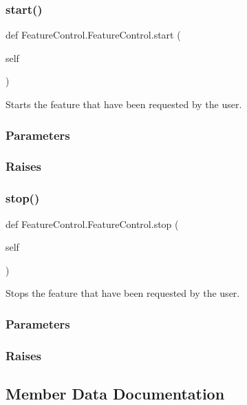 \subsubsection{\texorpdfstring{start()}{start()}}
{\footnotesize\ttfamily def Feature\+Control.\+Feature\+Control.\+start (\begin{DoxyParamCaption}\item[{}]{self }\end{DoxyParamCaption})}



Starts the feature that have been requested by the user. 

\subsubsection*{Parameters }

\subsubsection*{Raises }\mbox{\label{classFeatureControl_1_1FeatureControl_a1dc5cd2f9a7fe0aa97c77a4f5f6d1c86}} 
\subsubsection{\texorpdfstring{stop()}{stop()}}
{\footnotesize\ttfamily def Feature\+Control.\+Feature\+Control.\+stop (\begin{DoxyParamCaption}\item[{}]{self }\end{DoxyParamCaption})}



Stops the feature that have been requested by the user. 

\subsubsection*{Parameters }

\subsubsection*{Raises }

\subsection{Member Data Documentation}
\mbox{\label{classFeatureControl_1_1FeatureControl_a95e3fe171ba7d3d44f3d237c204ebb0e}} 
